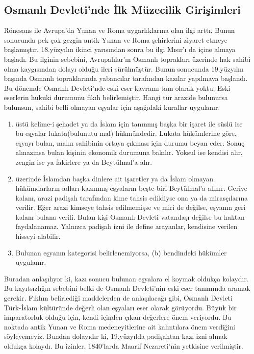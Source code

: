\subsection{Osmanlı Devleti'nde İlk Müzecilik Girişimleri}
\indent\indent Rönesans ile Avrupa'da Yunan ve Roma uygarlıklarına olan ilgi arttı. Bunun sonucunda pek çok gezgin antik Yunan ve Roma şehirlerini ziyaret etmeye başlamıştır. 18.yüzyılın ikinci yarısından sonra bu ilgi Mısır'ı da içine almaya başladı. Bu ilginin sebebini, Avrupalılar'ın Osmanlı toprakları üzerinde hak sahibi olma kaygısından dolayı olduğu ileri sürülmüştür.\cite{shaw} Bunun sonucunda 19.yüzyılın başında Osmanlı topraklarında yabancılar tarafından kazılar yapılmaya başlandı. Bu dönemde Osmanlı Devleti'nde eski eser kavramı tam olarak yoktu. Eski eserlerin hukuki durumunu fıkıh belirlemiştir. Hangi tür arazide bulunursa bulunsun, sahibi belli olmayan eşyalar için aşağıdaki kurallar uygulanır.\cite{mumcu_1}
\begin{enumerate}[label=\alph*)]
    \item üstü kelime-i şehadet ya da İslam için tanınmış başka bir işaret ile süslü ise bu eşyalar lukata(bulunutu mal) hükmündedir. Lukata hükümlerine göre, eşyayı bulan, malın sahibinin ortaya çıkması için durumu beyan eder. Sonuç alınazmsa bulan kişinin ekonomik durumuna bakılır. Yoksul ise kendisi alır, zengin ise ya fakirlere ya da Beytülmal'a alır.
    \item üzerinde İslamdan başka dinlere ait işaretler ya da İslam olmayan hükümdarların adları kazınmış eşyaların beşte biri Beytülmal'a alınır. Geriye kalanı, arazi padişah tarafından kime tahsis edildiyse ona ya da mirasçılarına verilir. Eğer arazi kimseye tahsis edilmemişse ve miri de değilse, eşyanın geri kalanı bulana verili. Bulan kişi Osmanlı Devleti vatandaşı değilse bu haktan faydalanamaz. Yalnızca padişah izni ile define arayanlar, kendisine verilen hisseyi alabilir.
    \item Bulunan eşyanın kategorisi belirlenemiyorsa, (b) bendindeki hükümler uygulanır.
\end{enumerate}
\indent\indent Buradan anlaşılıyor ki, kazı sonucu bulunan eşyalara el koymak oldukça kolaydır. Bu kayıtsızlığın sebebini belki de Osmanlı Devleti'nin eski eser tanımında aramak gerekir. Fıkhın belirlediği maddelerden de anlaşılacağı gibi, Osmanlı Devleti Türk-İslam kültüründe değerli olan eşyaları eser olarak görüyordu. Büyük bir imparatorluk olduğu için, kendi içinden çıkan değerlere önem veriyordu. Bu noktada antik Yunan ve Roma medeneyitlerine ait kalıntılara önem verdiğini söyleyemeyiz. Bundan dolayıdır ki, 19.yüzyılda padişahtan kazı izni almak oldukça kolaydı. Bu izinler, 1840'larda Maarif Nezareti'nin yetkisine verilmiştir.\cite{dilbaz_1}\newline
